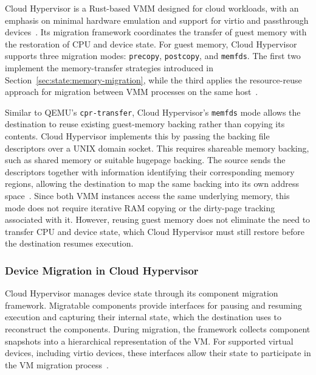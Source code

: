 Cloud Hypervisor is a Rust-based VMM designed for cloud workloads, with an 
emphasis on minimal hardware emulation and support for virtio and passthrough 
devices~\cite{cloud-hypervisor}. Its migration framework coordinates the 
transfer of guest memory with the restoration of CPU and device state. For 
guest memory, Cloud Hypervisor supports three migration modes: \texttt{precopy}, 
\texttt{postcopy}, and \texttt{memfds}. The first two implement the 
memory-transfer strategies introduced in Section~\ref{sec:state:memory-migration}, 
while the third applies the resource-reuse approach for migration between VMM 
processes on the same host~\cite{cloud-hypervisor-live-migration}.

Similar to QEMU's \texttt{cpr-transfer}, Cloud Hypervisor's \texttt{memfds} 
mode allows the destination to reuse existing guest-memory backing rather than 
copying its contents. Cloud Hypervisor implements this by passing the backing 
file descriptors over a UNIX domain socket. This requires shareable memory 
backing, such as shared memory or suitable hugepage backing. The source sends 
the descriptors together with information identifying their corresponding 
memory regions, allowing the destination to map the same backing into its own 
address space~\cite{cloud-hypervisor-live-migration,cloud-hypervisor-migration-code,cloud-hypervisor-memory-code}. 
Since both VMM instances access the same underlying memory, this mode does not 
require iterative RAM copying or the dirty-page tracking associated with it. 
However, reusing guest memory does not eliminate the need to transfer CPU and 
device state, which Cloud Hypervisor must still restore before the destination 
resumes execution.

\subsubsection{Device Migration in Cloud Hypervisor}
\label{sec:state:cloud-hypervisor-device-migration}

Cloud Hypervisor manages device state through its component migration framework. 
Migratable components provide interfaces for pausing and resuming execution and 
capturing their internal state, which the destination uses to reconstruct the 
components. During migration, the framework collects component snapshots into 
a hierarchical representation of the VM. For supported virtual devices, 
including virtio devices, these interfaces allow their state to participate in 
the VM migration process~\cite{cloud-hypervisor-migration-framework}.

